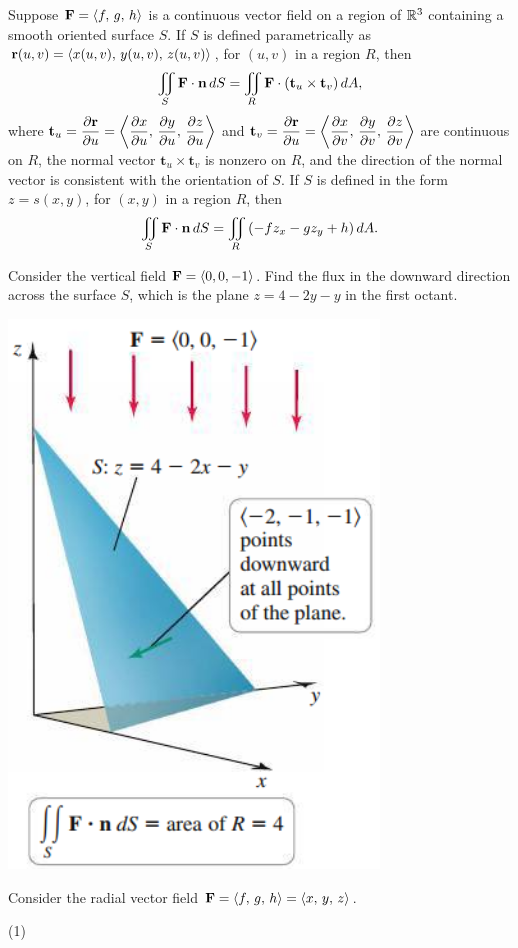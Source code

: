 \documentclass[mathNotesPreamble]{subfiles}
\begin{document}
  \begin{defn*}
    Suppose $\mathbf F={\left\langle f,\,g,\,h \right\rangle}$ is a continuous vector field on a region of $\mathbb{R}^3$ containing a smooth oriented surface $S$. If $S$ is defined parametrically as ${\mathbf{r}}(u,v)={\left\langle x(u,v),\,y(u,v),\,z(u,v) \right\rangle}$, for $(u,v)$ in a region $R$, then
      \[\iint\limits_S \mathbf F\cdot{\mathbf{n}}\,dS=\iint\limits_R \mathbf F\cdot{\left(\mathbf t_u\times\mathbf t_v\right)}\,dA,\]
    where $\displaystyle\mathbf t_u=\frac{\partial {\mathbf{r}}}{\partial u}={\left\langle \frac{\partial x}{\partial u},\,\frac{\partial y}{\partial u},\,\frac{\partial z}{\partial u} \right\rangle}$ and $\displaystyle\mathbf t_v=\frac{\partial {\mathbf{r}}}{\partial u}={\left\langle \frac{\partial x}{\partial v},\,\frac{\partial y}{\partial v},\,\frac{\partial z}{\partial v} \right\rangle}$ are continuous on $R$, the normal vector $\mathbf t_u\times\mathbf t_v$ is nonzero on $R$, and the direction of the normal vector is consistent with the orientation of $S$. If $S$ is defined in the form $z=s(x,y)$, for $(x,y)$ in a region $R$, then
      \[\iint\limits_S \mathbf F\cdot{\mathbf{n}}\,dS=\iint\limits_R {\left(-fz_x-gz_y+h\right)}\,dA.\]
  \end{defn*}
  \pagebreak

  \begin{ex*}
    Consider the vertical field $\mathbf F={\left\langle 0,0,-1 \right\rangle}$. Find the flux in the downward direction across the surface $S$, which is the plane $z=4-2y-y$ in the first octant.
  \end{ex*}
  \begin{flushright}
    \includegraphics[width=0.25\linewidth]{images/briggs_17_06/fig17_58}
  \end{flushright}
  \pagebreak

  \begin{ex*}
    Consider the radial vector field $\mathbf F={\left\langle f,\,g,\,h \right\rangle}={\left\langle x,\,y,\,z \right\rangle}$. 
  \end{ex*}
  \begin{tasks}[after-item-skip=\stretch{1}, label=](1)
    \task 
    \task 
  \end{tasks}
  \pagebreak
\end{document}
